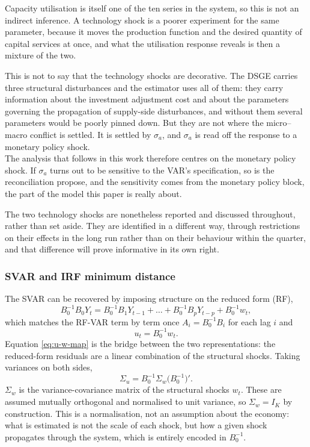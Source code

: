 \documentclass[12pt, a4paper]{article}
\begin{document}
Capacity utilisation is itself one of the ten series in the
system, so this is not an indirect inference. A technology shock is a poorer experiment for the
same parameter, because it moves the production function and the desired quantity of capital
services at once, and what the utilisation response reveals is then a mixture of the two.

This is not to say that the technology shocks are decorative. The DSGE carries three structural
disturbances and the estimator uses all of them: they carry information about the investment
adjustment cost and about the parameters governing the propagation of supply-side disturbances,
and without them several parameters would be poorly pinned down. But they are not where the
micro--macro conflict is settled. It is settled by $\sigma_a$, and $\sigma_a$ is read off the
response to a monetary policy shock.
\\

The analysis that follows in this work therefore centres on the monetary policy shock.
If $\sigma_a$ turns
out to be sensitive to the VAR's specification, so is the reconciliation \citet{ACEL2011}
propose, and the sensitivity comes from the monetary policy block, the part of the model this
paper is really about.

The two technology shocks are nonetheless reported and discussed throughout, rather than set
aside. They are identified in a different way, through restrictions on their effects in the
long run rather than on their behaviour within the quarter, and that difference will prove
informative in its own right.

\subsubsection*{SVAR and IRF minimum distance}

The SVAR can be recovered by imposing structure on the reduced form (RF),
\begin{equation}
    B_0^{-1}B_0Y_t = B_0^{-1}B_1Y_{t-1} + \dots + B_0^{-1}B_pY_{t-p} + B_0^{-1}w_t,
\end{equation}
which matches the RF-VAR term by term once $A_i = B_0^{-1}B_i$ for each lag $i$ and
\begin{equation}
    u_t = B_0^{-1}w_t .
    \label{eq:u-w-map}
\end{equation}
Equation \eqref{eq:u-w-map} is the bridge between the two representations: the
reduced-form residuals are a linear combination of the structural shocks. Taking
variances on both sides,
\begin{equation}
    \Sigma_u = B_0^{-1}\Sigma_w\bigl(B_0^{-1}\bigr)' .
    \label{eq:sigma-map}
\end{equation}
$\Sigma_w$ is the variance-covariance matrix of the structural shocks $w_t$. These
are assumed mutually orthogonal and normalised to unit variance, so $\Sigma_w = I_K$
by construction. This is a normalisation, not an assumption about the economy: what
is estimated is not the scale of each shock, but how a given shock propagates through
the system, which is entirely encoded in $B_0^{-1}$.
\end{document}
